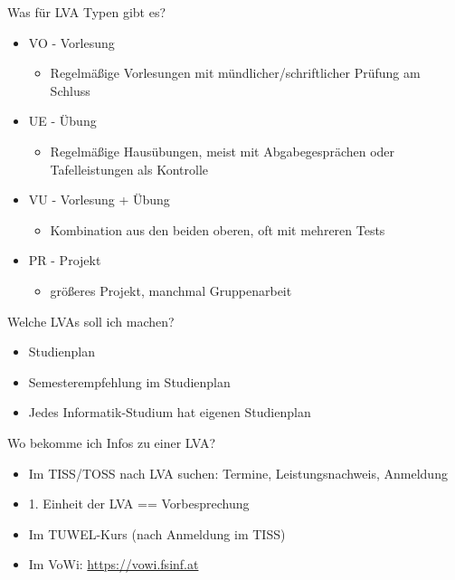 \documentclass{beamer}
\begin{document}
\begin{frame}{Was für LVA Typen gibt es?}
    \begin{itemize}
        \item VO - Vorlesung
            \begin{itemize}
                \item Regelmäßige Vorlesungen mit mündlicher/schriftlicher Prüfung am Schluss
            \end{itemize}
        \item UE - Übung
            \begin{itemize}
                \item Regelmäßige Hausübungen, meist mit Abgabegesprächen oder Tafelleistungen als Kontrolle
            \end{itemize}
        \item VU - Vorlesung + Übung
            \begin{itemize}
                \item Kombination aus den beiden oberen, oft mit mehreren Tests
            \end{itemize}
        \item PR - Projekt
            \begin{itemize}
                \item größeres Projekt, manchmal Gruppenarbeit
            \end{itemize}
    \end{itemize}
\end{frame}

\begin{frame}{Welche LVAs soll ich machen?}
    \begin{itemize}
        \item Studienplan
        \item Semesterempfehlung im Studienplan
        \item Jedes Informatik-Studium hat eigenen Studienplan
    \end{itemize}
\end{frame}

\begin{frame}{Wo bekomme ich Infos zu einer LVA?}
    \begin{itemize}
        \item Im TISS/TOSS nach LVA suchen: Termine, Leistungsnachweis, Anmeldung
        \item 1. Einheit der LVA == Vorbesprechung
        \item Im TUWEL-Kurs (nach Anmeldung im TISS)
        \item Im VoWi: \url{https://vowi.fsinf.at}
    \end{itemize}
\end{frame}
\end{document}
